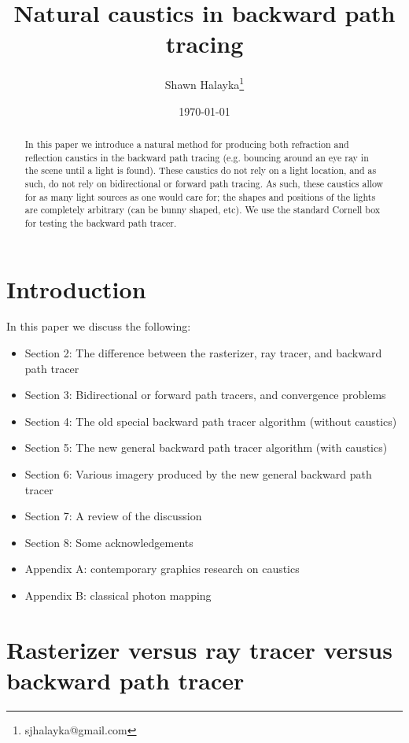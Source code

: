 \documentclass[12pt]{article}
\title{Natural caustics in backward path tracing}
\author{
Shawn Halayka\footnote{sjhalayka@gmail.com}
}
\date{\today\;\currenttime}
\begin{document}
\newcommand{\abs}[1]{\lvert#1\rvert}



\maketitle




\begin{abstract}
In this paper we introduce a natural method for producing both refraction and reflection caustics in the backward path tracing (e.g. bouncing around an eye ray in the scene until a light is found).
These caustics do not rely on a light location, and as such, do not rely on bidirectional or forward path tracing.
As such, these caustics allow for as many light sources as one would care for; the shapes and positions of the lights are completely arbitrary (can be bunny shaped, etc).
We use the standard Cornell box for testing the backward path tracer.
\end{abstract}



\section{Introduction}

In this paper we discuss the following:
\begin{itemize}
\item Section 2: The difference between the rasterizer, ray tracer, and backward path tracer
\item Section 3: Bidirectional or forward path tracers, and convergence problems
\item Section 4: The old special backward path tracer algorithm (without caustics)
\item Section 5: The new general backward path tracer algorithm (with caustics)
\item Section 6: Various imagery produced by the new general backward path tracer
\item Section 7: A review of the discussion
\item Section 8: Some acknowledgements
\item Appendix A: contemporary graphics research on caustics
\item Appendix B: classical photon mapping
\end{itemize}




\section{Rasterizer versus ray tracer versus backward path tracer}
\end{document}
